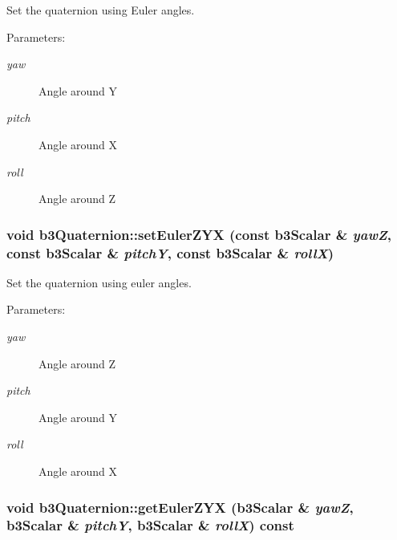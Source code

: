 Set the quaternion using Euler angles. 

\begin{Desc}
\item[Parameters:]
\begin{description}
\item[{\em yaw}]Angle around Y \item[{\em pitch}]Angle around X \item[{\em roll}]Angle around Z \end{description}
\end{Desc}
\hypertarget{classb3_quaternion_78e3817a97a72fd1e32d4d17e40be362}{
\subsubsection[setEulerZYX]{\setlength{\rightskip}{0pt plus 5cm}void b3Quaternion::setEulerZYX (const b3Scalar \& {\em yawZ}, \/  const b3Scalar \& {\em pitchY}, \/  const b3Scalar \& {\em rollX})}}
\label{classb3_quaternion_78e3817a97a72fd1e32d4d17e40be362}


Set the quaternion using euler angles. 

\begin{Desc}
\item[Parameters:]
\begin{description}
\item[{\em yaw}]Angle around Z \item[{\em pitch}]Angle around Y \item[{\em roll}]Angle around X \end{description}
\end{Desc}
\hypertarget{classb3_quaternion_6d11b2745e4a668ef7a1d6dd9d97f621}{
\subsubsection[getEulerZYX]{\setlength{\rightskip}{0pt plus 5cm}void b3Quaternion::getEulerZYX (b3Scalar \& {\em yawZ}, \/  b3Scalar \& {\em pitchY}, \/  b3Scalar \& {\em rollX}) const}}
\label{classb3_quaternion_6d11b2745e4a668ef7a1d6dd9d97f621}


